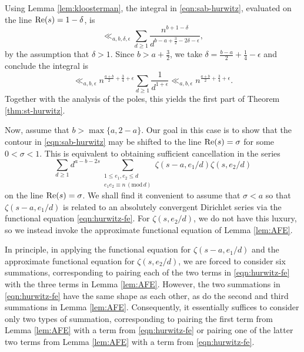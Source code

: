 \documentclass[12pt]{amsart}
\numberwithin{equation}{section}
\numberwithin{theorem}{section}
\renewcommand\Re{\textnormal{Re}}
\renewcommand{\pmod}[1]{\,\left(\mathrm{mod}\,#1\right)}
\begin{document}
Using Lemma \ref{lem:kloosterman}, 
the integral in \eqref{eqn:sab-hurwitz}, evaluated on the line $\Re(s)=1-\delta$, is
\[
	\ll_{a,b,\delta,\epsilon} \sum_{d \geq 1} \frac{n^{b+1-\delta}}{d^{b-a+\frac{3}{2}-2\delta-\epsilon}},
\]
by the assumption that $\delta > 1$.  Since $b>a+\frac{3}{2}$, we take $\delta = \frac{b-a}{2}+\frac{1}{4}-\epsilon$ and conclude the integral is
\[
	\ll_{a,b,\epsilon} n^{\frac{a+b}{2}+\frac{3}{4} + \epsilon} \sum_{d \geq 1} \frac{1}{d^{1+\epsilon}} \ll_{a,b,\epsilon} n^{\frac{a+b}{2}+\frac{3}{4} + \epsilon}.
\]
Together with the analysis of the poles, this yields the first part of Theorem \ref{thm:st-hurwitz}.

Now, assume that $b > \max\{a,2-a\}$.  Our goal in this case is to show that the contour in \eqref{eqn:sab-hurwitz} may be shifted to the line $\Re(s)=\sigma$ for some $0 < \sigma < 1$.  This is equivalent to obtaining sufficient cancellation in the series
\begin{equation} \label{eqn:afe-setup}
	\sum_{d \geq 1} d^{a-b-2s} \sum_{\substack{ 1 \leq e_1,e_2 \leq d \\ e_1e_2 \equiv n\pmod{d}}} \zeta(s-a, e_1/d) \zeta(s, e_2/d)
\end{equation}
on the line $\Re(s)=\sigma$.  We shall find it convenient to assume that $\sigma < a$ so that $\zeta(s-a,e_1/d)$ is related to an absolutely convergent Dirichlet series via the functional equation \eqref{eqn:hurwitz-fe}.  For $\zeta(s,e_2/d)$, we do not have this luxury, so we instead invoke the approximate functional equation of Lemma \ref{lem:AFE}.


In principle, in applying the functional equation for $\zeta(s-a,e_1/d)$ and the approximate functional equation for $\zeta(s,e_2/d)$, we are forced to consider six summations, corresponding to pairing each of the two terms in \eqref{eqn:hurwitz-fe} with the three terms in Lemma \ref{lem:AFE}.  However, the two summations in \eqref{eqn:hurwitz-fe} have the same shape as each other, as do the second and third summations in Lemma \ref{lem:AFE}.  Consequently, it essentially suffices to consider only two types of summation, corresponding to pairing the first term from Lemma \ref{lem:AFE} with a term from \eqref{eqn:hurwitz-fe} or pairing one of the latter two terms from Lemma \ref{lem:AFE} with a term from \eqref{eqn:hurwitz-fe}.
\end{document}
